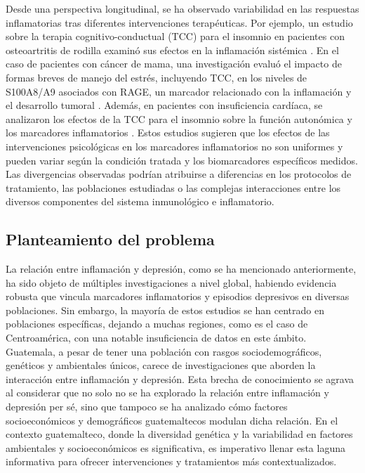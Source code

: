\documentclass[jou]{apa7}
\begin{document}
	Desde una perspectiva longitudinal, se ha observado variabilidad en las respuestas inflamatorias tras diferentes intervenciones terapéuticas. Por ejemplo, un estudio sobre la terapia cognitivo-conductual (TCC) para el insomnio en pacientes con osteoartritis de rodilla examinó sus efectos en la inflamación sistémica \parencite{munPreliminaryExaminationEffects2024}. En el caso de pacientes con cáncer de mama, una investigación evaluó el impacto de formas breves de manejo del estrés, incluyendo TCC, en los niveles de S100A8/A9 asociados con RAGE, un marcador relacionado con la inflamación y el desarrollo tumoral \parencite{taubEffectsRandomizedTrial2019}. Además, en pacientes con insuficiencia cardíaca, se analizaron los efectos de la TCC para el insomnio sobre la función autonómica y los marcadores inflamatorios \parencite{redekerEffectsCognitiveBehavioral2020}. Estos estudios sugieren que los efectos de las intervenciones psicológicas en los marcadores inflamatorios no son uniformes y pueden variar según la condición tratada y los biomarcadores específicos medidos. Las divergencias observadas podrían atribuirse a diferencias en los protocolos de tratamiento, las poblaciones estudiadas o las complejas interacciones entre los diversos componentes del sistema inmunológico e inflamatorio.

	\subsection{Planteamiento del problema}

	La relación entre inflamación y depresión, como se ha mencionado anteriormente, ha sido objeto de múltiples
	investigaciones a nivel global, habiendo evidencia robusta que vincula
	marcadores inflamatorios y episodios depresivos en diversas poblaciones.
	Sin embargo, la mayoría de estos estudios se han centrado en poblaciones
	específicas, dejando a muchas regiones, como es el caso de Centroamérica, con una
	notable insuficiencia de datos en este ámbito.\\

	Guatemala, a pesar de tener una población con rasgos sociodemográficos,
	genéticos y ambientales únicos, carece de investigaciones que aborden la
	interacción entre inflamación y depresión. Esta brecha de conocimiento
	se agrava al considerar que no solo no se ha explorado la relación entre
	inflamación y depresión per sé, sino que tampoco se ha analizado cómo
	factores socioeconómicos y demográficos guatemaltecos modulan dicha
	relación. En el contexto guatemalteco, donde la diversidad genética y la
	variabilidad en factores ambientales y socioeconómicos es significativa,
	es imperativo llenar esta laguna informativa para ofrecer intervenciones
	y tratamientos más contextualizados.
\end{document}
